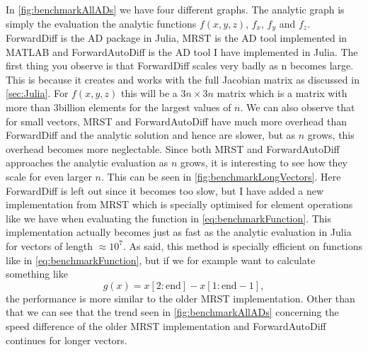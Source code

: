 In \autoref{fig:benchmarkAllADs} we have four different graphs. The analytic graph is simply the evaluation the analytic functions $f(x,y,z)$, $f_x$, $f_y$ and $f_z$. ForwardDiff is the AD package in Julia, MRST is the AD tool implemented in MATLAB and ForwardAutoDiff is the AD tool I have implemented in Julia. The first thing you observe is that ForwardDiff scales very badly as n becomes large. This is because it creates and works with the full Jacobian matrix as discussed in \autoref{sec:Julia}. For $f(x,y,z)$ this will be a $3n \times 3n$ matrix which is a matrix with more than 3billion elements for the largest values of $n$. We can also observe that for small vectors, MRST and ForwardAutoDiff have much more overhead than ForwardDiff and the analytic solution and hence are slower, but as $n$ grows, this overhead becomes more neglectable. Since both MRST and ForwardAutoDiff approaches the analytic evaluation as $n$ grows, it is interesting to see how they scale for even larger $n$. This can be seen in \autoref{fig:benchmarkLongVectors}. Here ForwardDiff is left out since it becomes too slow, but I have added a new implementation from MRST which is specially optimised for element operations like we have when evaluating the function in \eqref{eq:benchmarkFunction}. This implementation actually becomes just as fast as the analytic evaluation in Julia for vectors of length $\approx 10^7$. As said, this method is specially efficient on functions like in \eqref{eq:benchmarkFunction}, but if we for example want to calculate something like
\begin{equation}
g(x) = x\left[2:\text{end}\right] - x\left[1:\text{end}-1\right],
\label{eq:differenceFunction}
\end{equation}
the performance is more similar to the older MRST implementation. Other than that we can see that the trend seen in \autoref{fig:benchmarkAllADs} concerning the speed difference of the older MRST implementation and ForwardAutoDiff continues for longer vectors.

